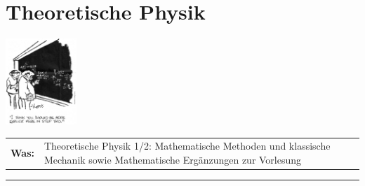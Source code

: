 \section{Theoretische Physik}
\begin{center}

  \includegraphics[width=0.2\textwidth]{bilder/miracleoccurs.jpg}

\end{center}
\begin{tabular}{l p{}}
\textbf{Was:} & Theoretische Physik 1/2: Mathematische Methoden und klassische Mechanik sowie Mathematische Ergänzungen zur Vorlesung\\
\end{tabular}
\rule{\textwidth}{0.1pt}

